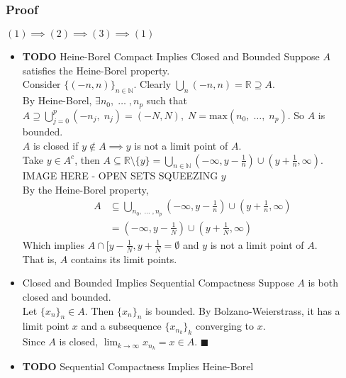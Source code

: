 \documentclass[11pt]{article}
\newcommand{\0}{\emptyset}
\newcommand{\N}{\mathbb{N}}
\newcommand{\R}{\mathbb{R}}
\begin{document}
\subsubsection*{Proof}
\label{sec:org03e150a}
\((1)\implies(2)\implies(3)\implies(1)\)\\[0pt]
\begin{itemize}
\item {\bfseries\sffamily TODO} Heine-Borel Compact Implies Closed and Bounded
\label{sec:orgaff104c}
Suppose \(A\) satisfies the Heine-Borel property.\\[0pt]
Consider \(\{(-n,n)\}_{n\in\N}\). Clearly \(\bigcup_{n}(-n,n)=\R\supseteq A\).\\[0pt]
By Heine-Borel, \(\exists n_{0},\;\ldots\;,n_{p}\) such that \(A\supseteq\bigcup_{j=0}^{p}(-n_{j},\;n_{j})=(-N,N),\;N=\text{max}(n_{0},\;\ldots,\;n_{p})\). So \(A\) is bounded.\\[0pt]
\(A\) is closed if \(y\not\in A\implies y\) is not a limit point of \(A\).\\[0pt]
Take \(y\in A^{c}\), then \(A\subseteq\R\setminus\{y\}=\bigcup_{n\in\N}(-\infty,y-\frac{1}{n})\cup(y+\frac{1}{n},\infty)\).\\[0pt]
IMAGE HERE - OPEN SETS SQUEEZING \(y\)\\[0pt]
By the Heine-Borel property, \\[0pt]
\begin{align*}
  A
  &\subseteq \bigcup_{n_{0},\;\ldots\;,n_{p}}(-\infty,y-\frac{1}{n})\cup(y+\frac{1}{n},\infty)
  \\&=(-\infty,y-\frac{1}{N} )\cup(y+\frac{1}{N},\infty)
\end{align*}
Which implies \(A\cap[y-\frac{1}{N},y+\frac{1}{N}=\0\) and \(y\) is not a limit point of \(A\).\\[0pt]
That is, \(A\) contains its limit points.\\[0pt]
\item Closed and Bounded Implies Sequential Compactness
\label{sec:org8d6a649}
Suppose \(A\) is both closed and bounded.\\[0pt]
Let \(\{x_{n}\}_{n}\in A\). Then \(\{x_{n}\}_{n}\) is bounded. By Bolzano-Weierstrass, it has a limit point \(x\) and a subsequence \(\{x_{n_{k}}\}_{k}\) converging to \(x\).\\[0pt]
Since \(A\) is closed, \(\lim_{k\to\infty}x_{n_{k}}=x\in A\). \(\blacksquare\)\\[0pt]
\item {\bfseries\sffamily TODO} Sequential Compactness Implies Heine-Borel

\end{itemize}
\end{document}
